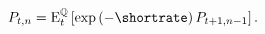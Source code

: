\begin{equation} \label{eq:nPzeroQ}
	\Pzero = \ExpQ \left[ \exp\left(- \shortrate\right) \Pzerolag \right].
\end{equation}